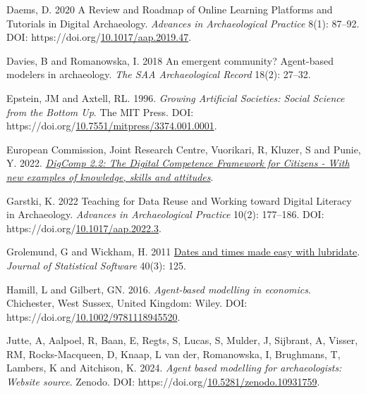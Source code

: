 \documentclass[
]{article}
\newlength{\cslhangindent}
\newlength{\cslentryspacingunit} %
\newenvironment{CSLReferences}[2] %
 {%
  \setlength{\parindent}{0pt}
  \ifodd #1
  \let\oldpar\par
  \def\par{\hangindent=\cslhangindent\oldpar}
  \fi
  \setlength{\parskip}{#2\cslentryspacingunit}
 }%
 {}
\begin{document}
\begin{CSLReferences}{1}{0}
\leavevmode{}%
Daems, D. 2020 A Review and Roadmap of Online Learning Platforms and Tutorials in Digital Archaeology. \emph{Advances in Archaeological Practice} 8(1): 87--92. DOI: https://doi.org/\href{https://doi.org/10.1017/aap.2019.47}{10.1017/aap.2019.47}.

\leavevmode{}%
Davies, B and Romanowska, I. 2018 An emergent community? Agent-based modelers in archaeology. \emph{The SAA Archaeological Record} 18(2): 27--32.

\leavevmode{}%
Epstein, JM and Axtell, RL. 1996. \emph{Growing Artificial Societies: Social Science from the Bottom Up}. The MIT Press. DOI: https://doi.org/\href{https://doi.org/10.7551/mitpress/3374.001.0001}{10.7551/mitpress/3374.001.0001}.

\leavevmode{}%
European Commission, Joint Research Centre, Vuorikari, R, Kluzer, S and Punie, Y. 2022. \emph{\href{https://data.europa.eu/doi/10.2760/115376}{DigComp 2.2: The Digital Competence Framework for Citizens - With new examples of knowledge, skills and attitudes}}.

\leavevmode{}%
Garstki, K. 2022 Teaching for Data Reuse and Working toward Digital Literacy in Archaeology. \emph{Advances in Archaeological Practice} 10(2): 177--186. DOI: https://doi.org/\href{https://doi.org/10.1017/aap.2022.3}{10.1017/aap.2022.3}.

\leavevmode{}%
Grolemund, G and Wickham, H. 2011 \href{https://www.jstatsoft.org/v40/i03/}{Dates and times made easy with lubridate}. \emph{Journal of Statistical Software} 40(3): 125.

\leavevmode{}%
Hamill, L and Gilbert, GN. 2016. \emph{Agent-based modelling in economics}. Chichester, West Sussex, United Kingdom: Wiley. DOI: https://doi.org/\href{https://doi.org/10.1002/9781118945520}{10.1002/9781118945520}.

\leavevmode{}%
Jutte, A, Aalpoel, R, Baan, E, Regts, S, Lucas, S, Mulder, J, Sijbrant, A, Visser, RM, Rocks-Macqueen, D, Knaap, L van der, Romanowska, I, Brughmans, T, Lambers, K and Aitchison, K. 2024. \emph{Agent based modelling for archaeologists: Website source}. Zenodo. DOI: https://doi.org/\href{https://doi.org/10.5281/zenodo.10931759}{10.5281/zenodo.10931759}.


\end{CSLReferences}
\end{document}
